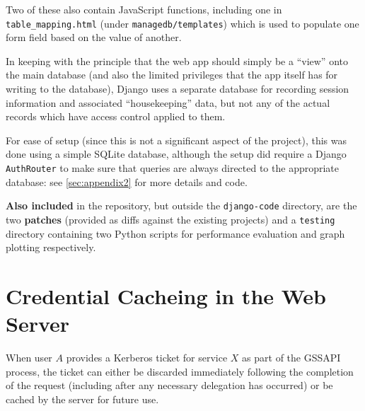 \documentclass[12pt]{report}
\begin{document}
Two of these also contain JavaScript functions, including one in \verb+table_mapping.html+ (under \verb+managedb/templates+) which is used to populate one form field based on the value of another.

In keeping with the principle that the web app should simply be a ``view'' onto the main database (and also the limited privileges that the app itself has for writing to the database), Django uses a separate database for recording session information and associated ``housekeeping'' data, but not any of the actual records which have access control applied to them.

For ease of setup (since this is not a significant aspect of the project), this was done using a simple SQLite database, although the setup did require a Django \texttt{AuthRouter} to make sure that queries are always directed to the appropriate database: see \autoref{sec:appendix2} for more details and code.

\textbf{Also included} in the repository, but outside the \verb+django-code+ directory, are the two \textbf{patches} (provided as diffs against the existing projects) and a \verb+testing+ directory containing two Python scripts for performance evaluation and graph plotting respectively.

\section{Credential Cacheing in the Web Server}
\label{sec:credential_cacheing}
When user $A$ provides a Kerberos ticket for service $X$ as part of the GSSAPI process, the ticket can either be discarded immediately following the completion of the request (including after any necessary delegation has occurred) or be cached by the server for future use.
\end{document}

